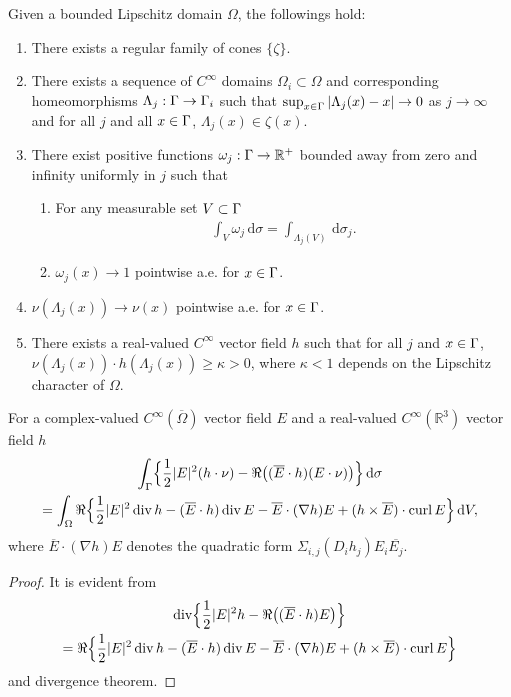 \begin{prp}
  \label{pr:lip}
  Given a bounded Lipschitz domain $\Omega$, the followings hold:
  \begin{enumerate}
    \item\label{it:lip1}
      There exists a regular family of cones $\{\zeta\}$.
    \item There exists a sequence of $C^\infty$ domains 
      $\Omega_i\subset \Omega$ and corresponding homeomorphisms 
      $\Lambda_j:\Gamma\to\Gamma_i$ such that 
      $\sup_{x\in\Gamma}|\Lambda_j(x)-x|\to 0$ as $j\to\infty$ and
      for all $j$ and all $x\in\Gamma$, $\Lambda_j(x)\in\zeta(x)$.
    \item There exist positive functions 
      $\omega_j:\Gamma\to\mathbb{R}^+$ bounded away from zero and infinity 
      uniformly in $j$ such that 
      \begin{enumerate}
	\item For any measurable set $V\subset\Gamma$
	  \begin{align*}
	    \int_V \omega_j\,\text{d}\sigma=\int_{\Lambda_j(V)}\,\text{d}\sigma_j.
	  \end{align*}
	\item $\omega_j(x)\to 1$ pointwise a.e. for $x\in\Gamma$. 
      \end{enumerate}
    \item $\nu(\Lambda_j(x))\to\nu(x)$ pointwise a.e. for $x\in\Gamma$. 
    \item\label{it:kk}
      There exists a real-valued $C^{\infty}$ vector field $h$ such that for
      all $j$ and $x\in\Gamma$, 
      $\nu(\Lambda_j(x))\cdot h(\Lambda_j(x))\geqslant \kappa>0$, where 
      $\kappa < 1$ depends on the Lipschitz character of $\Omega$. 
  \end{enumerate}
\end{prp}

\begin{lmm}
  For a complex-valued $C^{\infty}(\overline{\Omega})$ vector field $E$ and
  a real-valued $C^{\infty}(\mathbb{R}^3)$ vector field $h$
  \begin{multline}
    \int_{\Gamma}\Bigl\{\frac{1}{2}|E|^2 (h\cdot\nu)-\Re\bigl((\overline{E}\cdot h)
    (E\cdot\nu)\bigr)\Bigr\}\,\text{d}\sigma\\
    =\int_{\Omega}\Re\Bigl\{\frac{1}{2}|E|^2\operatorname{div} h-(\overline{E}\cdot h)\operatorname{div} E
    -\overline{E}\cdot(\nabla h)E+(h\times\overline{E})\cdot\operatorname{curl} E\Bigr\}\,\text{d}V,
    \label{eq:Rellich}
  \end{multline}
  where $\overline{E}\cdot(\nabla h)E$ denotes the quadratic form
  $\Sigma_{i,j}(D_i h_j) E_i \overline{E_j}$.
\end{lmm}
\begin{proof}
  It is evident from
  \begin{multline*}
    \operatorname{div}\Bigl\{\frac{1}{2}|E|^2 h-\Re\bigl((\overline{E}\cdot h)E\bigr)
    \Bigr\}\\
    =\Re\Bigl\{\frac{1}{2}|E|^2\operatorname{div} h-(\overline{E}\cdot h)\operatorname{div} E-
    \overline{E}\cdot(\nabla h)E+(h\times\overline{E})\cdot\operatorname{curl} E\Bigr\}
  \end{multline*}
  and divergence theorem. 
\end{proof}

